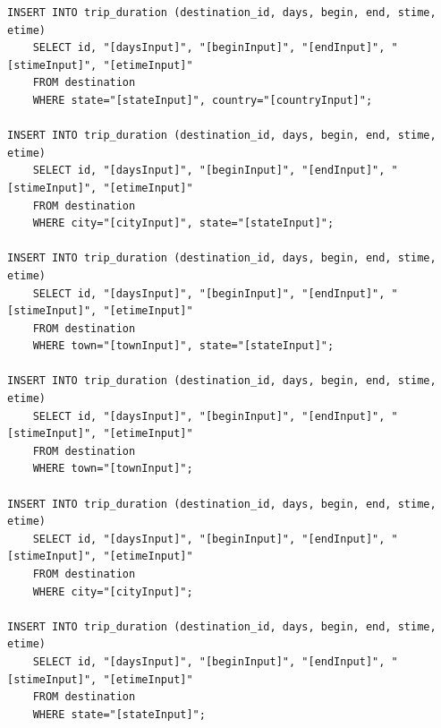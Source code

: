 \documentclass[letterpaper,10pt,onecolumn,compsoc]{IEEEtran}
\begin{document}
\begin{verbatim}
INSERT INTO trip_duration (destination_id, days, begin, end, stime, etime) 
	SELECT id, "[daysInput]", "[beginInput]", "[endInput]", "[stimeInput]", "[etimeInput]" 
	FROM destination 
	WHERE state="[stateInput]", country="[countryInput]";
	
INSERT INTO trip_duration (destination_id, days, begin, end, stime, etime) 
	SELECT id, "[daysInput]", "[beginInput]", "[endInput]", "[stimeInput]", "[etimeInput]" 
	FROM destination 
	WHERE city="[cityInput]", state="[stateInput]";
	
INSERT INTO trip_duration (destination_id, days, begin, end, stime, etime) 
	SELECT id, "[daysInput]", "[beginInput]", "[endInput]", "[stimeInput]", "[etimeInput]" 
	FROM destination 
	WHERE town="[townInput]", state="[stateInput]";
	
INSERT INTO trip_duration (destination_id, days, begin, end, stime, etime) 
	SELECT id, "[daysInput]", "[beginInput]", "[endInput]", "[stimeInput]", "[etimeInput]" 
	FROM destination 
	WHERE town="[townInput]";
	
INSERT INTO trip_duration (destination_id, days, begin, end, stime, etime) 
	SELECT id, "[daysInput]", "[beginInput]", "[endInput]", "[stimeInput]", "[etimeInput]" 
	FROM destination 
	WHERE city="[cityInput]";
	
INSERT INTO trip_duration (destination_id, days, begin, end, stime, etime) 
	SELECT id, "[daysInput]", "[beginInput]", "[endInput]", "[stimeInput]", "[etimeInput]" 
	FROM destination 
	WHERE state="[stateInput]";
\end{verbatim}

\newpage
\end{document}
